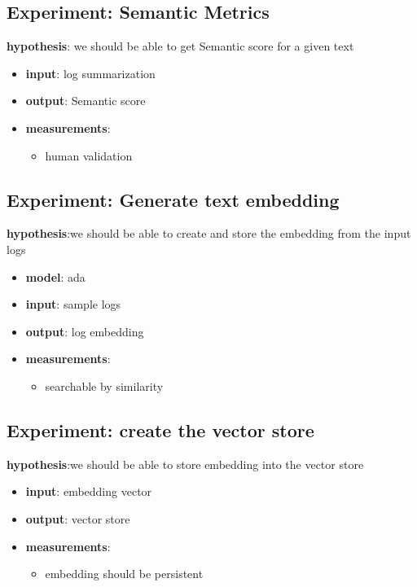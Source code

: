 \documentclass[conference]{IEEEtran}
\begin{document}
\subsection{Experiment: Semantic Metrics}
\textbf{hypothesis}: we should be able to get Semantic score for a given text
\begin{itemize}
    \item \textbf{input}: log summarization
    \item \textbf{output}: Semantic score 
    \item \textbf{measurements}:
    \begin{itemize}
        \item human validation
    \end{itemize}
\end{itemize}

\subsection{Experiment: Generate text embedding}
\textbf{hypothesis}:we should be able to create and store the embedding from the input logs
\begin{itemize}
    \item \textbf{model}: ada
    \item \textbf{input}: sample logs
    \item \textbf{output}: log embedding
    \item \textbf{measurements}:
    \begin{itemize}
        \item searchable by similarity
    \end{itemize}
\end{itemize}

\subsection{Experiment: create the vector store}
\textbf{hypothesis}:we should be able to store embedding into the vector store
\begin{itemize}
    \item \textbf{input}: embedding vector
    \item \textbf{output}: vector store
    \item \textbf{measurements}:
    \begin{itemize}
        \item embedding should be persistent
    \end{itemize}
\end{itemize}
\end{document}
